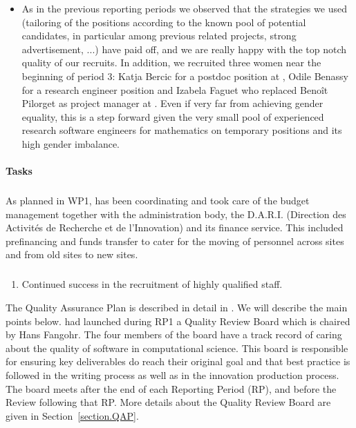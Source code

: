 \begin{itemize}
\item As in the previous reporting periods we observed that the
  strategies we used (tailoring of the positions according to the
  known pool of potential candidates, in particular among previous
  related projects, strong advertisement, ...) have paid off, and we
  are really happy with the top notch quality of our recruits. In
  addition, we recruited three women near the beginning of period 3:
  Katja Bercic for a postdoc position at , Odile Benassy for
  a research engineer position and Izabela Faguet who replaced Benoît
  Pilorget as project manager at . Even if very far from
  achieving gender equality, this is a step forward given the very
  small pool of experienced research software engineers for
  mathematics on temporary positions and its high gender imbalance.
\end{itemize}


\paragraph{Tasks}

\subparagraph{}

As planned in WP1,  has been coordinating \ODK and took care
of the budget management together with the administration body, the
D.A.R.I. (Direction des Activités de Recherche et de l'Innovation) and
its finance service. This included prefinancing and funds transfer to
cater for the moving of personnel across sites and from old sites to
new sites.


\subparagraph{}


\begin{enumerate}
\item Continued success in the recruitment of highly qualified staff.
\end{enumerate}

The Quality Assurance Plan is described in detail in
. We will describe the main points
below.  had launched during RP1 a Quality Review Board which
is chaired by Hans Fangohr. The four members of the board have a track
record of caring about the quality of software in computational
science. This board is responsible for ensuring key deliverables do
reach their original goal and that best practice is followed in the
writing process as well as in the innovation production process. The
board meets after the end of each Reporting Period (RP), and before
the Review following that RP. More details about the Quality Review
Board are given in Section~\ref{section.QAP}.

